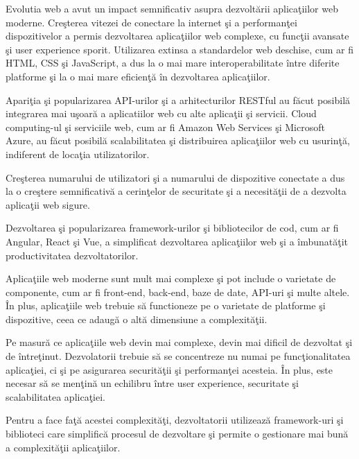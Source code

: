 \documentclass[12pt, a4paper]{report}
\begin{document}

Evolutia web a avut un impact semnificativ asupra dezvolt\u arii aplica\c tiilor web moderne. Cre\c sterea vitezei de conectare la internet \c si a performan\c tei dispozitivelor a permis dezvoltarea aplica\c tiilor web complexe, cu func\c tii avansate \c si user experience sporit. Utilizarea extinsa a standardelor web deschise, cum ar fi HTML, CSS \c si JavaScript, a dus la o mai mare interoperabilitate \^intre diferite platforme \c si la o mai mare eficien\c t\u a \^in dezvoltarea aplica\c tiilor.

Apari\c tia \c si popularizarea API-urilor \c si a arhitecturilor RESTful au f\u acut posibil\u a integrarea mai u\c soar\u a a aplicatiilor web cu alte aplica\c tii \c si servicii. Cloud computing-ul \c si serviciile web, cum ar fi Amazon Web Services \c si Microsoft Azure, au f\u acut posibil\u a scalabilitatea \c si distribuirea aplica\c tiilor web cu usurin\c t\u a, indiferent de loca\c tia utilizatorilor.

Cre\c sterea numarului de utilizatori \c si a numarului de dispozitive conectate a dus la o cre\c stere semnificativ\u a a cerin\c telor de securitate \c si a necesit\u a\c tii de a dezvolta aplica\c tii web sigure.

Dezvoltarea \c si popularizarea framework-urilor \c si bibliotecilor de cod, cum ar fi Angular, React \c si Vue, a simplificat dezvoltarea aplica\c tiilor web \c si a \^imbunat\u a\c tit productivitatea dezvoltatorilor.

Aplica\c tiile web moderne sunt mult mai complexe \c si pot include o varietate de componente, cum ar fi front-end, back-end, baze de date, API-uri \c si multe altele. \^In plus, aplica\c tiile web trebuie s\u a functioneze pe o varietate de platforme \c si dispozitive, ceea ce adaug\u a o alt\u a dimensiune a complexit\u a\c tii.

Pe masur\u a ce aplica\c tiile web devin mai complexe, devin mai dificil de dezvoltat \c si de \^intre\c tinut. Dezvolatorii trebuie s\u a se concentreze nu numai pe func\c tionalitatea aplica\c tiei, ci \c si pe asigurarea securit\u a\c tii \c si performan\c tei acesteia. \^In plus, este necesar s\u a se men\c tin\u a un echilibru \^intre user experience, securitate \c si scalabilitatea aplica\c tiei.

Pentru a face fa\c t\u a acestei complexit\u a\c ti, dezvoltatorii utilizeaz\u a framework-uri \c si biblioteci care simplific\u a procesul de dezvoltare \c si permite o gestionare mai bun\u a a complexit\u a\c tii aplica\c tiilor.
\end{document}
